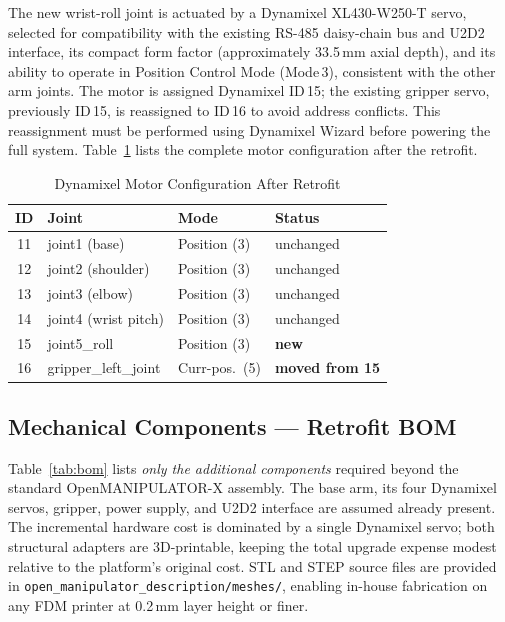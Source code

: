 \documentclass[conference]{IEEEtran}
\begin{document}
		The new wrist-roll joint is actuated by a Dynamixel XL430-W250-T
		servo, selected for compatibility with the existing RS-485 daisy-chain
		bus and U2D2 interface, its compact form factor (approximately
		33.5\,mm axial depth), and its ability to operate in Position Control
		Mode (Mode\,3), consistent with the other arm joints. The motor is
		assigned Dynamixel ID\,15; the existing gripper servo, previously
		ID\,15, is reassigned to ID\,16 to avoid address conflicts. This
		reassignment must be performed using Dynamixel Wizard before powering
		the full system. Table~\ref{tab:motors} lists the complete motor
		configuration after the retrofit.
		
		\begin{table}[t]
			\centering
			\caption{Dynamixel Motor Configuration After Retrofit}
			\label{tab:motors}
			\renewcommand{\arraystretch}{1.2}
			\footnotesize
			\begin{tabular}{clll}
				\toprule
				\textbf{ID} & \textbf{Joint} & \textbf{Mode} & \textbf{Status} \\
				\midrule
				11 & joint1 (base)        & Position (3)   & unchanged \\
				12 & joint2 (shoulder)    & Position (3)   & unchanged \\
				13 & joint3 (elbow)       & Position (3)   & unchanged \\
				14 & joint4 (wrist pitch) & Position (3)   & unchanged \\
				15 & joint5\_roll         & Position (3)   & \textbf{new} \\
				16 & gripper\_left\_joint & Curr-pos.\ (5) & \textbf{moved from 15} \\
				\bottomrule
			\end{tabular}
		\end{table}
		
		\subsection{Mechanical Components --- Retrofit BOM}
		
		Table~\ref{tab:bom} lists \textit{only the additional components}
		required beyond the standard OpenMANIPULATOR-X assembly. The base
		arm, its four Dynamixel servos, gripper, power supply, and U2D2
		interface are assumed already present. The incremental hardware cost
		is dominated by a single Dynamixel servo; both structural adapters
		are 3D-printable, keeping the total upgrade expense modest relative
		to the platform's original cost. STL and STEP source files are
		provided in \texttt{open\_manipulator\_description/meshes/}, enabling
		in-house fabrication on any FDM printer at 0.2\,mm layer height or
		finer.
		
\end{document}
